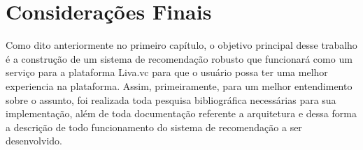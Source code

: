 \chapter{Considerações Finais}

Como dito anteriormente no primeiro capítulo, o objetivo principal desse trabalho é a construção de um sistema de recomendação robusto que funcionará como um serviço para a plataforma Liva.vc para que o usuário possa ter uma melhor experiencia na plataforma. Assim, primeiramente, para um melhor entendimento sobre o assunto, foi realizada toda pesquisa bibliográfica necessárias para sua implementação, além de toda documentação referente a arquitetura e dessa forma a descrição de todo funcionamento do sistema de recomendação a ser desenvolvido.

